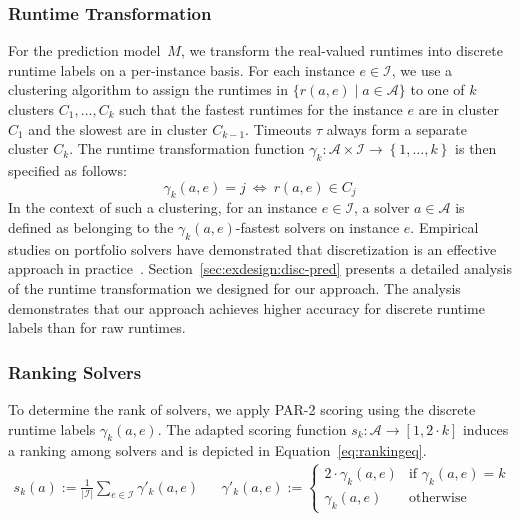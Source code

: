 \documentclass[sn-basic, Numbered]{sn-jnl} %
\begin{document}
\subsubsection{Runtime Transformation}
\label{sec:main:model:transformation}

For the prediction model~$M$, we transform the real-valued runtimes into discrete runtime labels on a per-instance basis.
For each instance $e \in \mathcal{I}$, we use a clustering algorithm to assign the runtimes in $\bigl\{ r(a, e) \mid a \in \mathcal{A} \bigr\}$ to one of $k$ clusters $C_1, \dots, C_k$ such that the fastest runtimes for the instance $e$ are in cluster $C_1$ and the slowest are in cluster $C_{k-1}$.
Timeouts $\tau$ always form a separate cluster $C_{k}$.
The runtime transformation function $\gamma_k : {\mathcal{A} \times \mathcal{I}} \rightarrow \left\lbrace 1, \dots, k \right\rbrace$ is then specified as follows:
%
$$\gamma_k(a, e) = j ~\Leftrightarrow~ r(a, e) \in C_j$$
%
In the context of such a clustering, for an instance $e \in \mathcal{I}$, a solver $a \in \mathcal{A}$ is defined as belonging to the $\gamma_k(a, e)$-fastest solvers on instance $e$. 
%
Empirical studies on portfolio solvers have demonstrated that discretization is an effective approach in practice~\cite{CollauttiMMO13,NgokoCT19}.
Section~\ref{sec:exdesign:disc-pred} presents a detailed analysis of the runtime transformation we designed for our approach.
The analysis demonstrates that our approach achieves higher accuracy for discrete runtime labels than for raw runtimes.

\subsubsection{Ranking Solvers}
\label{sec:main:model:ranking}

To determine the rank of solvers, we apply PAR-2 scoring using the discrete runtime labels $\gamma_k(a, e)$.
The adapted scoring function $s_k : \mathcal{A} \rightarrow [1, 2 \cdot k]$ induces a ranking among solvers and is depicted in Equation~\eqref{eq:rankingeq}.
%
\begin{align}
  s_k(a) := \frac{1}{|\mathcal{I}|} \sum_{e \in \mathcal{I}} \gamma'_k(a, e)
  &&
  \gamma'_k(a, e) := \begin{cases}
    2 \cdot \gamma_k(a, e)   & \text{if } \gamma_k(a, e) = k\\
  \gamma_k(a, e)  & \text{otherwise}
  \end{cases}
  \label{eq:rankingeq}
\end{align}
%
\end{document}
